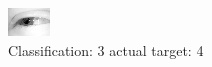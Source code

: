 \begin{figure}[h!]
\begin{center}
\includegraphics[width=0.60\columnwidth]{figures/ID2449_class_3_target_4.png}
\end{center}
\caption{ Classification: 3 actual target: 4}
\label{fig:ID2449_class_3_target_4}
\end{figure}

